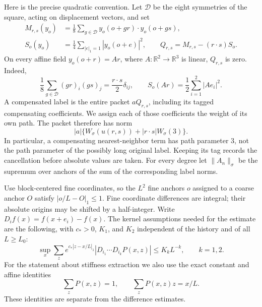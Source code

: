 Here is the precise quadratic convention.  Let $\mathcal D$ be the
eight symmetries of the square, acting on displacement vectors, and set
\begin{align}
 M_{r,s}(y_o)&=\frac18\sum_{g\in\mathcal D}
          y_o(o+gr)\mathbin{\cdot}y_o(o+gs),\nonumber\\
 S_o(y_o)&=\frac14\sum_{|e|_1=1}|y_o(o+e)|^2,
 \qquad Q_{r,s}=M_{r,s}-(r\mathbin{\cdot}s)S_o.
 \label{supp:quadratic-packet}
\end{align}
On every affine field $y_o(o+r)=Ar$, where $A:\mathbb R^2\to\mathbb R^3$
is linear, $Q_{r,s}$ is zero.  Indeed,
\begin{equation}
 \frac18\sum_{g\in\mathcal D}(gr)_i(gs)_j
       =\frac{r\mathbin{\cdot}s}{2}\delta_{ij},
 \qquad S_o(Ar)=\frac12\sum_{i=1}^2|Ae_i|^2.
 \label{supp:quadratic-affine-cancellation}
\end{equation}
A compensated label is the entire packet $aQ_{r,s}$, including its
tagged compensating coefficients.  We assign each of those coefficients
the weight of its own path.  The packet therefore has norm
\begin{equation}
 |a|\{W_\sigma(u(r,s))
           +|r\mathbin{\cdot}s|W_\sigma(3)\}.
 \label{supp:quadratic-packet-norm}
\end{equation}
In particular, a compensating nearest-neighbor term has path parameter
$3$, not the path parameter of the possibly long original label.
Keeping its tag records the cancellation before absolute values are
taken.  For every degree let $\|A_n\|_\sigma$ be the supremum over anchors
of the sum of the corresponding label norms.

Use block-centered fine coordinates, so the $L^2$ fine anchors $o$ assigned
to a coarse anchor $O$ satisfy $|o/L-O|_1\le1$.  Fine coordinate differences
are integral; their absolute origins may be shifted by a half-integer.
Write $D_i f(x)=f(x+e_i)-f(x)$.  The kernel assumptions needed for the
estimate are the following, with $c_*>0$, $K_1$, and $K_2$ independent of
the history and of all $L\ge L_0$:
\begin{equation}
 \sup_x\sum_z e^{c_*|z-x/L|_1}
       |D_{i_1}\cdots D_{i_k}P(x,z)|
       \le K_kL^{-k},\qquad k=1,2.
 \label{supp:fixed-norm-kernel-assumption}
\end{equation}
For the statement about stiffness extraction we also use the exact
constant and affine identities
\begin{equation}
 \sum_zP(x,z)=1,\qquad \sum_zP(x,z)z=x/L.
 \label{supp:fixed-norm-affine-assumption}
\end{equation}
These identities are separate from the difference estimates.

